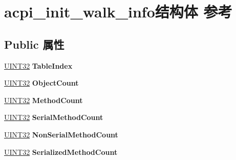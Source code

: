 \hypertarget{structacpi__init__walk__info}{}\section{acpi\+\_\+init\+\_\+walk\+\_\+info结构体 参考}
\label{structacpi__init__walk__info}
\subsection*{Public 属性}
\begin{DoxyCompactItemize}
\item 
\mbox{\label{structacpi__init__walk__info_a863d6f6a1ad551125529b1bdb70bd533}} 
\hyperlink{_processor_bind_8h_ae1e6edbbc26d6fbc71a90190d0266018}{U\+I\+N\+T32} {\bfseries Table\+Index}
\item 
\mbox{\label{structacpi__init__walk__info_a32f9714177987a3d50ffe099aa21322e}} 
\hyperlink{_processor_bind_8h_ae1e6edbbc26d6fbc71a90190d0266018}{U\+I\+N\+T32} {\bfseries Object\+Count}
\item 
\mbox{\label{structacpi__init__walk__info_a3d526bc265d84ad3cf75337a86df65ce}} 
\hyperlink{_processor_bind_8h_ae1e6edbbc26d6fbc71a90190d0266018}{U\+I\+N\+T32} {\bfseries Method\+Count}
\item 
\mbox{\label{structacpi__init__walk__info_a17a6d8b2d67861d183a078ca9e79e9d0}} 
\hyperlink{_processor_bind_8h_ae1e6edbbc26d6fbc71a90190d0266018}{U\+I\+N\+T32} {\bfseries Serial\+Method\+Count}
\item 
\mbox{\label{structacpi__init__walk__info_a42c0206777a3f31170a3cde9bb11a3b4}} 
\hyperlink{_processor_bind_8h_ae1e6edbbc26d6fbc71a90190d0266018}{U\+I\+N\+T32} {\bfseries Non\+Serial\+Method\+Count}
\item 
\mbox{\label{structacpi__init__walk__info_a92c03d25455f672eee07974ccaf33c79}} 
\hyperlink{_processor_bind_8h_ae1e6edbbc26d6fbc71a90190d0266018}{U\+I\+N\+T32} {\bfseries Serialized\+Method\+Count}
\item 
\mbox{\label{structacpi__init__walk__info_a23bbfe93dc27321144028d51c2583440}} 

\end{DoxyCompactItemize}
